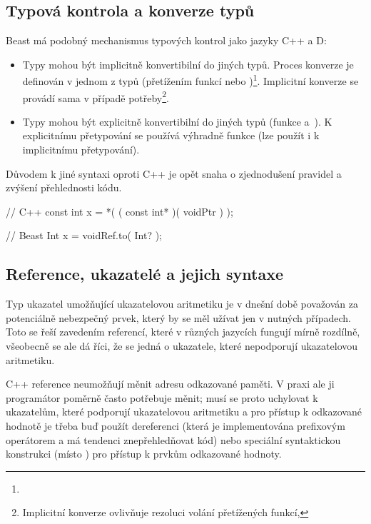 \subsection{Typová kontrola a konverze typů}
Beast má podobný mechanismus typových kontrol jako jazyky C++ a D:
\begin{itemize}
	\item Typy mohou být implicitně konvertibilní do jiných typů. Proces konverze je definován v jednom z typů (přetížením funkcí  nebo )\footnote{}. Implicitní konverze se provádí sama v případě potřeby\footnote{Implicitní konverze ovlivňuje rezoluci volání přetížených funkcí, }.
	\item Typy mohou být explicitně konvertibilní do jiných typů (funkce  a~). K explicitnímu přetypování se používá výhradně funkce  (lze použít i k implicitnímu přetypování).
\end{itemize}

Důvodem k jiné syntaxi oproti C++ je opět snaha o zjednodušení pravidel a zvýšení přehlednosti kódu.

\begin{cppcode}
// C++
const int x = *( ( const int* )( voidPtr ) );
\end{cppcode}

\begin{code}
// Beast
Int x = voidRef.to( Int? );
\end{code}

\subsection{Reference, ukazatelé a jejich syntaxe} \label{pointers}
Typ ukazatel umožňující ukazatelovou aritmetiku je v dnešní době považován za potenciálně nebezpečný prvek, který by se měl užívat jen v nutných případech. Toto se řeší zavedením referencí, které v různých jazycích fungují mírně rozdílně, všeobecně se ale dá říci, že se jedná o ukazatele, které nepodporují ukazatelovou aritmetiku.

C++ reference neumožňují měnit adresu odkazované paměti. V praxi ale ji programátor poměrně často potřebuje měnit; musí se proto uchylovat k ukazatelům, které podporují ukazatelovou aritmetiku a pro přístup k odkazované hodnotě je třeba buď použít dereferenci (která je implementována prefixovým operátorem  a má tendenci znepřehledňovat kód) nebo speciální syntaktickou konstrukci (místo  ) pro přístup k prvkům odkazované hodnoty.

